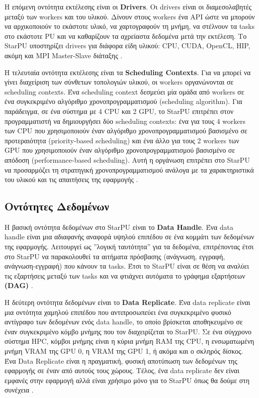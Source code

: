 Η επόμενη οντότητα εκτέλεσης είναι οι \textbf{Drivers}. Οι drivers είναι οι διαμεσολαβητές μεταξύ των workers και του υλικού. Δίνουν στους workers ένα API ώστε να μπορούν να αρχικοποιούν το εκάστοτε υλικό, να χαρτογραφούν τη μνήμη, να στέλνουν τα tasks στο εκάστοτε PU και να καθαρίζουν τα αχρείαστα δεδομένα μετά την εκτέλεση. Το StarPU υποστηρίζει drivers για διάφορα είδη υλικού: CPU, CUDA, OpenCL, HIP, ακόμη και MPI Master-Slave διάταξης \cite{starpu2025handbook, starpu_dev_manual}.

Η τελευταία οντότητα εκτέλεσης είναι τα \textbf{Scheduling Contexts}. Για να μπορεί να γίνει διαχείριση των σύνθετων τοπολογιών υλικού, οι workers οργανώνονται σε scheduling contexts. Ένα scheduling context δεσμεύει μία ομάδα από workers σε ένα συγκεκριμένο αλγόριθμο χρονοπρογραμματισμού (scheduling algorithm). Για παράδειγμα, σε ένα σύστημα με 4 CPU και 2 GPU, το StarPU επιτρέπει στον προγραμματιστή να δημιουργήσει δύο scheduling contexts: ένα για τους 4 workers των CPU που χρησιμοποιούν έναν αλγόριθμο χρονοπρογραμματισμού βασισμένο σε προτεραιότητα (priority-based scheduling) και ένα άλλο για τους 2 workers των GPU που χρησιμοποιούν έναν αλγόριθμο χρονοπρογραμματισμού βασισμένο σε απόδοση (performance-based scheduling). Αυτή η οργάνωση επιτρέπει στο StarPU να προσαρμόζει τη στρατηγική χρονοπρογραμματισμού ανάλογα με τα χαρακτηριστικά του υλικού και τις απαιτήσεις της εφαρμογής \cite{starpu2025handbook, starpu_dev_manual}. 

\subsection{Οντότητες Δεδομένων}

Η βασική οντότητα δεδομένων στο StarPU είναι το \textbf{Data Handle}. Ένα data handle είναι μια αδιαφανής αναφορά υψηλού επιπέδου σε ένα κομμάτι των δεδομένων της εφαρμογής. Λειτουργεί ως ''λογική ταυτότητα'' για τα δεδομένα, επιτρέποντας έτσι στο StarPU να παρακολουθεί τα αιτήματα πρόσβασης (ανάγνωση, εγγραφή, ανάγνωση-εγγραφή) που κάνουν τα tasks. Έτσι το StarPU είναι σε θέση να αναλύει τις εξαρτήσεις μεταξύ των tasks και να φτιάχνει αυτόματα το γράφημα εξαρτήσεων \textbf{(DAG)} \cite{starpu2025handbook,starpu_dev_manual}.

Η δεύτερη οντότητα δεδομένων είναι το \textbf{Data Replicate}. Ένα data replicate είναι μια οντότητα χαμηλού επιπέδου που αντιπροσωπεύει ένα συγκεκριμένο φυσικό αντίγραφο των δεδομένων ενός data handle, το οποίο βρίσκεται αποθηκευμένο σε έναν συγκεκριμένο κόμβο μνήμης που τον διαχειρίζεται το StarPU. Σε ένα σύγχρονο σύστημα HPC, κόμβοι μνήμης είναι η κύρια μνήμη RAM της CPU, η ενσωματωμένη μνήμη VRAM της GPU 0, η VRAM της GPU 1, ή ακόμα και ο σκληρός δίσκος. Ένα Data Replicate είναι η πραγματική, φυσική αποτύπωση των δεδομένων της εφαρμογής σε έναν από αυτούς τους χώρους. Τέλος, ένα data replicate δεν είναι εμφανές στην εφαρμογή αλλά είναι χρήσιμο μόνο για το StarPU όπως θα δούμε στη συνέχεια \cite{starpu2025handbook, starpu_dev_manual}.

